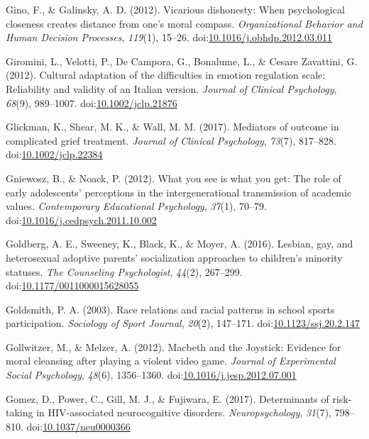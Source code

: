 \documentclass[english,man]{apa6}
\theoremstyle{definition}
\theoremstyle{definition}
\theoremstyle{definition}
\theoremstyle{remark}
\begin{document}
\hypertarget{ref-Gino2012}{}
Gino, F., \& Galinsky, A. D. (2012). Vicarious dishonesty: When
psychological closeness creates distance from one's moral compass.
\emph{Organizational Behavior and Human Decision Processes},
\emph{119}(1), 15--26.
doi:\href{https://doi.org/10.1016/j.obhdp.2012.03.011}{10.1016/j.obhdp.2012.03.011}

\hypertarget{ref-Giromini2012}{}
Giromini, L., Velotti, P., De Campora, G., Bonalume, L., \& Cesare
Zavattini, G. (2012). Cultural adaptation of the difficulties in emotion
regulation scale: Reliability and validity of an Italian version.
\emph{Journal of Clinical Psychology}, \emph{68}(9), 989--1007.
doi:\href{https://doi.org/10.1002/jclp.21876}{10.1002/jclp.21876}

\hypertarget{ref-Glickman2017}{}
Glickman, K., Shear, M. K., \& Wall, M. M. (2017). Mediators of outcome
in complicated grief treatment. \emph{Journal of Clinical Psychology},
\emph{73}(7), 817--828.
doi:\href{https://doi.org/10.1002/jclp.22384}{10.1002/jclp.22384}

\hypertarget{ref-Gniewosz2012}{}
Gniewosz, B., \& Noack, P. (2012). What you see is what you get: The
role of early adolescents' perceptions in the intergenerational
transmission of academic values. \emph{Contemporary Educational
Psychology}, \emph{37}(1), 70--79.
doi:\href{https://doi.org/10.1016/j.cedpsych.2011.10.002}{10.1016/j.cedpsych.2011.10.002}

\hypertarget{ref-Goldberg2016}{}
Goldberg, A. E., Sweeney, K., Black, K., \& Moyer, A. (2016). Lesbian,
gay, and heterosexual adoptive parents' socialization approaches to
children's minority statuses. \emph{The Counseling Psychologist},
\emph{44}(2), 267--299.
doi:\href{https://doi.org/10.1177/0011000015628055}{10.1177/0011000015628055}

\hypertarget{ref-Goldsmith2003}{}
Goldsmith, P. A. (2003). Race relations and racial patterns in school
sports participation. \emph{Sociology of Sport Journal}, \emph{20}(2),
147--171.
doi:\href{https://doi.org/10.1123/ssj.20.2.147}{10.1123/ssj.20.2.147}

\hypertarget{ref-Gollwitzer2012}{}
Gollwitzer, M., \& Melzer, A. (2012). Macbeth and the Joystick: Evidence
for moral cleansing after playing a violent video game. \emph{Journal of
Experimental Social Psychology}, \emph{48}(6), 1356--1360.
doi:\href{https://doi.org/10.1016/j.jesp.2012.07.001}{10.1016/j.jesp.2012.07.001}

\hypertarget{ref-Gomez2017}{}
Gomez, D., Power, C., Gill, M. J., \& Fujiwara, E. (2017). Determinants
of risk-taking in HIV-associated neurocognitive disorders.
\emph{Neuropsychology}, \emph{31}(7), 798--810.
doi:\href{https://doi.org/10.1037/neu0000366}{10.1037/neu0000366}
\end{document}
